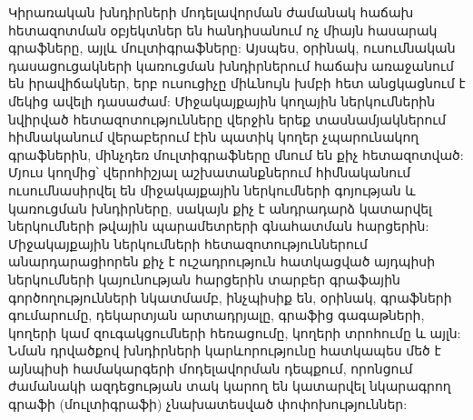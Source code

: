 Կիրառական խնդիրների մոդելավորման ժամանակ հաճախ հետազոտման օբյեկտներ են հանդիսանում ոչ միայն հասարակ գրաֆները, այլև մուլտիգրաֆները: Այսպես, օրինակ, ուսումնական դասացուցակների կառուցման խնդիրներում հաճախ առաջանում են իրավիճակներ, երբ ուսուցիչը միևնույն խմբի հետ անցկացնում է մեկից ավելի դասաժամ: Միջակայքային կողային ներկումներին նվիրված հետազոտությունները վերջին երեք տասնամյակներում հիմնականում վերաբերում էին պատիկ կողեր չպարունակող գրաֆներին, մինչդեռ մուլտիգրաֆները մնում են քիչ հետազոտված: Մյուս կողմից՝ վերոհիշյալ աշխատանքներում հիմնականում ուսումնասիրվել են միջակայքային ներկումների գոյության և կառուցման խնդիրները, սակայն քիչ է անդրադարձ կատարվել ներկումների թվային պարամետրերի գնահատման հարցերին: Միջակայքային ներկումների հետազոտություններում անարդարացիորեն քիչ է ուշադրություն հատկացված այդպիսի ներկումների կայունության հարցերին տարբեր գրաֆային գործողությունների նկատմամբ, ինչպիսիք են, օրինակ, գրաֆների գումարումը, դեկարտյան արտադրյալը, գրաֆից գագաթների, կողերի կամ զուգակցումների հեռացումը, կողերի տրոհումը և այլն: Նման դրվածքով խնդիրների կարևորությունը հատկապես մեծ է այնպիսի համակարգերի մոդելավորման դեպքում, որոնցում ժամանակի ազդեցության տակ կարող են կատարվել նկարագրող գրաֆի (մուլտիգրաֆի) չնախատեսված փոփոխություններ:


